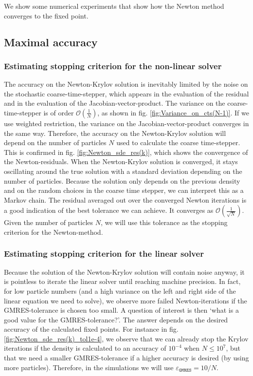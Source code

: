 


We show some numerical experiments that show how the Newton method converges to the fixed point. 

\subsection{Maximal accuracy}


\subsubsection{Estimating stopping criterion for the non-linear solver}
The accuracy on the Newton-Krylov solution is inevitably limited by the noise on the stochastic coarse-time-stepper, which appears in the evaluation of the residual and in the evaluation of the Jacobian-vector-product. The variance on the coarse-time-stepper is of order $\mathcal{O}(\frac{1}{N})$, as shown in fig. \ref{fig:Variance_on_cts(N-1)}. If we use weighted restriction, the variance on the Jacobian-vector-product converges in the same way.  Therefore, the accuracy on the Newton-Krylov solution will depend on the number of particles $N$ used to calculate the coarse time-stepper.  This is confirmed in fig. \ref{fig:Newton_sde_res(k)}, which shows the convergence of the Newton-residuals. When the Newton-Krylov solution is converged, it stays oscillating around the true solution with a standard deviation depending on the number of particles. Because the solution only depends on the previous density and on the random choices in the coarse time stepper, we can interpret this as a Markov chain. The residual averaged out over the converged Newton iterations is a good indication of the best tolerance we can achieve. It converges as $\mathcal{O}(\frac{1}{\sqrt{N}})$. Given the number of particles $N$,  we will use this tolerance as the stopping criterion for the Newton-method.

\subsubsection{Estimating stopping criterion for the linear solver}
Because the solution of the Newton-Krylov solution will contain noise anyway, it is pointless to iterate the linear solver until reaching machine precision.
In fact, for low particle numbers (and a high variance on the left and right side of the linear equation we need to solve), we observe more failed Newton-iterations if the GMRES-tolerance is chosen too small.  A question of interest is then `what is a good value for the GMRES-tolerance?'. The answer depends on the desired accuracy of the calculated fixed points. For instance in fig. \ref{fig:Newton_sde_res(k)_tol1e-4}, we observe that we  can already stop the Krylov iterations if the density is calculated to an accuracy of %
$10^{-4}$ when $N \leq 10^7$, but that we need a smaller GMRES-tolerance if a higher accuracy is desired (by using more particles). Therefore, in the simulations we  will use $\varepsilon_{\texttt{GMRES}}= 10/N$.


